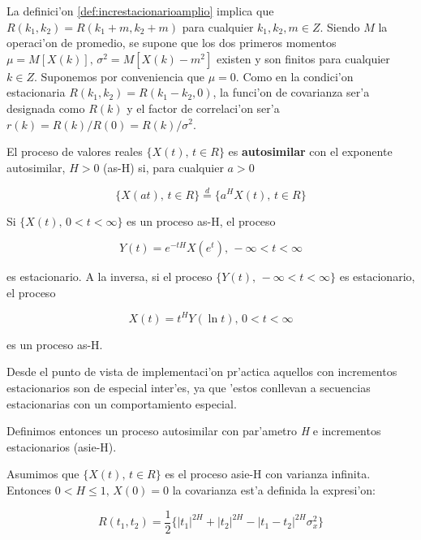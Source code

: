 La definici'on \ref{def:increstacionarioamplio} implica que
$R(k_1,k_2) = R(k_1 + m, k_2 + m)$ para cualquier $k_1, k_2, m \in Z$. Siendo
$M$ la operaci'on de promedio, se supone que los dos primeros momentos
$\mu = M[X(k)] \text{, } \sigma^2 = M[X(k) - m^2]$ existen y son finitos para
cualquier $k \in Z$. Suponemos por conveniencia que $\mu = 0$. Como en la
condici'on estacionaria $R(k_1,k_2) = R(k_1 - k_2, 0)$, la funci'on de
covarianza ser'a designada como $R(k)$ y el factor de correlaci'on ser'a
$r(k) = R(k)/R(0) = R(k)/\sigma^2$.

\begin{definicion} \label{def:ash}
El proceso de valores reales $\{X(t) \text{, } t \in R\}$ es {\bf autosimilar}
con el exponente autosimilar, $H > 0$ (as-H) si, para cualquier $a > 0$

\begin{equation} \label{eq:timespacechange}
\{X(at) \text{,  } t \in R\} \stackrel{d}{=} \{a^HX(t) \text{,  } t \in R\}
\end{equation}
\end{definicion}

\begin{teorema} \label{teo:tiposestacionarios}
Si $\{X(t) \text{, } 0 < t < \infty \}$ es un proceso as-H, el proceso

\begin{equation} \label{eq:tipoestacionarios1}
Y(t) = e^{-tH}X(e^t) \text{, } - \infty < t < \infty
\end{equation}

es estacionario. A la inversa, si el proceso
$\{ Y(t) \text{, } -\infty < t < \infty \}$ es estacionario, el proceso

\begin{equation} \label{eq:tipoestacionario2}
X(t) = t^HY(\ln t) \text{, } 0 < t < \infty
\end{equation}

es un proceso as-H.
\end{teorema}

Desde el punto de vista de implementaci'on pr'actica aquellos con incrementos
estacionarios son de especial inter'es, ya que 'estos conllevan a secuencias
estacionarias con un comportamiento especial.

Definimos entonces un proceso autosimilar con par'ametro {\it H} e 
incrementos estacionarios (asie-H).

\begin{lema} \label{lem:correlation}
Asumimos que $\{X(t) \text{, } t \in R \}$ es el proceso asie-H con
varianza infinita. Entonces $ 0 < H \le 1 \text{, } X(0) = 0$ la covarianza
est'a definida la expresi'on:

\begin{equation} \label{eq:correlation1}
R(t_1,t_2) = \frac{1}{2} \{ |t_1|^{2H} + |t_2|^{2H} - |t_1 - t_2|^{2H} \sigma_{x}^{2} \}
\end{equation}
\end{lema}

